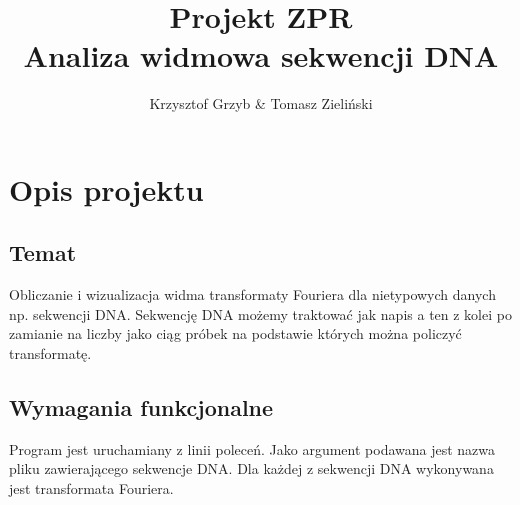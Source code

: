 \documentclass[a4size,final]{article}
\begin{document}
\normalsize
\pagestyle{plain}
\setcounter{secnumdepth}{1}
\title{\Huge{Projekt ZPR}\\ \Large{Analiza widmowa sekwencji DNA}}
\author{Krzysztof Grzyb & Tomasz Zieliński}
\maketitle


\section{Opis projektu}
\subsection*{Temat}
Obliczanie i wizualizacja widma transformaty Fouriera dla nietypowych danych np. sekwencji DNA. Sekwencję DNA możemy traktować jak napis a ten z kolei po zamianie na liczby jako ciąg próbek na podstawie których można policzyć transformatę.
\subsection{Wymagania funkcjonalne}
Program jest uruchamiany z linii poleceń. Jako argument podawana jest nazwa pliku zawierającego sekwencje DNA. Dla każdej z sekwencji DNA wykonywana jest transformata Fouriera.
\end{document}
